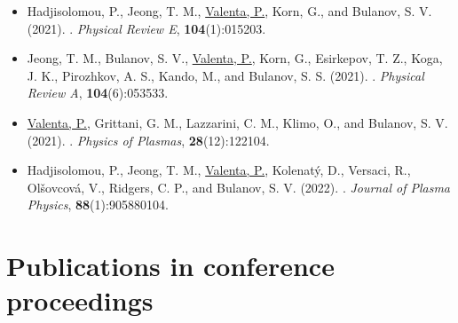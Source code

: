 \documentclass[10pt, a4paper, twoside, openright]{report}
\newcommand{\link}[3][blue]{\href{#2}{\color{#1}{#3}}}%
\begin{document}
\begin{itemize}
	\item Hadjisolomou, P., Jeong, T. M., \underline{Valenta, P.}, Korn, G., and Bulanov, S. V. (2021). \link{https://doi.org/10.1103/PhysRevE.104.015203}{Gamma-ray flash generation in irradiating a thin foil target by a single-cycle tightly focused extreme power laser pulse}. \textit{Physical Review E}, \textbf{104}(1):015203.
	
	\item Jeong, T. M., Bulanov, S. V., \underline{Valenta, P.}, Korn, G., Esirkepov, T. Z., Koga, J. K., Pirozhkov, A. S., Kando, M., and Bulanov, S. S. (2021). \link{https://doi.org/10.1103/PhysRevA.104.053533}{Relativistic-flying laser focus by a laser-produced parabolic plasma mirror}. \textit{Physical Review A}, \textbf{104}(6):053533.
	
	\item \underline{Valenta, P.}, Grittani, G. M., Lazzarini, C. M., Klimo, O., and Bulanov, S. V. (2021). \link{https://doi.org/10.1063/5.0065167}{On the electromagnetic-electron rings originating from the interaction of high-power short-pulse laser and underdense plasma}. \textit{Physics of Plasmas}, \textbf{28}(12):122104.
	
	\item Hadjisolomou, P., Jeong, T. M., \underline{Valenta, P.}, Kolenatý, D., Versaci, R., Olšovcová, V., Ridgers, C. P., and Bulanov, S. V. (2022). \link{https://doi.org/10.1017/S0022377821001318}{Gamma-ray flash in the interaction of a tightly focused single-cycle ultraintense laser pulse with a solid target}. \textit{Journal of Plasma Physics}, \textbf{88}(1):905880104.
	
\end{itemize}

\section{Publications in conference proceedings\label{sec:conference_proceedings}}
\end{document}
